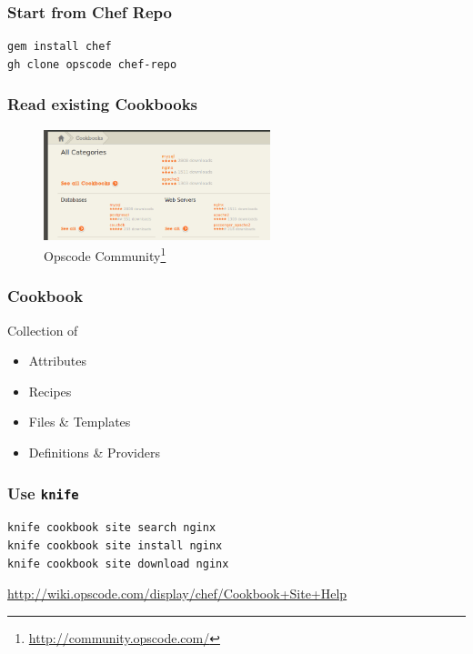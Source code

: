 \documentclass[xetex,mathserif,serif,12pt]{beamer}
\begin{document}
\begin{frame}[fragile]
  \frametitle{Start from Chef Repo}
  \begin{beamer@nomargin}
    \begin{lstlisting}[language=Bash,basicstyle=\large\ttfamily]
gem install chef
gh clone opscode chef-repo
    \end{lstlisting}
  \end{beamer@nomargin}
\end{frame}

\begin{frame}
  \frametitle{Read existing Cookbooks}
  \begin{beamer@nomargin}
    \begin{figure}
      \centering
      \includegraphics[height=3.2cm]{chef-community}
      \caption{Opscode Community\footnote{\url{http://community.opscode.com/}}}
      \label{fig:community}
    \end{figure}
  \end{beamer@nomargin}
\end{frame}

\begin{frame}
  \frametitle{Cookbook}

  \begin{definition}
    Collection of
    \begin{itemize}[<+->]
    \item Attributes
    \item Recipes
    \item Files \& Templates
    \item Definitions \& Providers
    \end{itemize}
  \end{definition}
\end{frame}

\begin{frame}[fragile]
  \frametitle{Use \texttt{knife}}

  \begin{beamer@nomargin}
  \begin{lstlisting}[language=Bash,basicstyle=\small\ttfamily]
knife cookbook site search nginx
knife cookbook site install nginx
knife cookbook site download nginx
  \end{lstlisting}
  \end{beamer@nomargin}

  \url{http://wiki.opscode.com/display/chef/Cookbook+Site+Help}
\end{frame}
\end{document}
